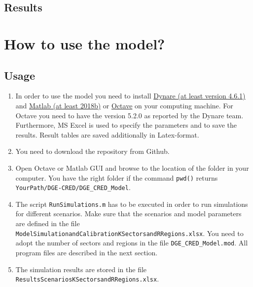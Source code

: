 \documentclass[10pt,a4paper]{article}
\begin{document}
\subsection{Results}

\cleardoublepage
\section{How to use the model?}\label{sec:modelusage}
\subsection{Usage}
\begin{enumerate}
\item In order to use the model you need to install \href{https://www.dynare.org/download/}{Dynare (at least version 4.6.1)} and \href{https://www.mathworks.com/products/matlab.html}{Matlab (at least 2018b)} or \href{https://www.gnu.org/software/octave/}{Octave} on your computing machine. 
For Octave you need to have the version 5.2.0 as reported by the Dynare team. 
Furthermore, MS Excel is used to specify the parameters and to save the results. Result tables are saved additionally in Latex-format.

\item You need to download the repository from Github. 
\item Open Octave or Matlab GUI and browse to the location of the folder in your computer. You have the right folder if the command {\tt pwd()} returns {\tt YourPath/DGE-CRED/DGE_CRED_Model}.
\item The script {\tt RunSimulations.m} has to be executed in order to run simulations for different scenarios. Make sure that the scenarios and model parameters are defined in the file \\ {\tt ModelSimulationandCalibrationKSectorsandRRegions.xlsx}. 
You need to adopt the number of sectors and regions in the file {\tt DGE\_CRED\_Model.mod}. All program files are described in the next section.
\item The simulation results are stored in the file {\tt ResultsScenariosKSectorsandRRegions.xlsx}.
\end{enumerate}
\end{document}
